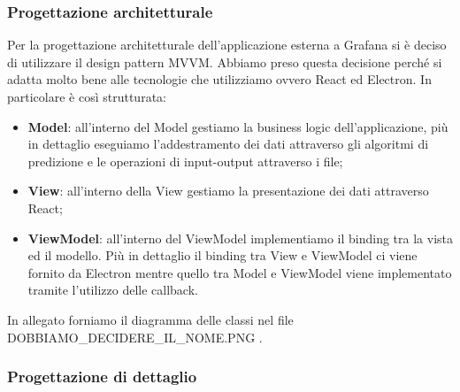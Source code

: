 		\subsubsection{Progettazione architetturale}
			Per la progettazione architetturale dell'applicazione esterna a Grafana si è deciso di utilizzare il design pattern MVVM. Abbiamo preso questa decisione perché si adatta molto bene alle tecnologie che utilizziamo ovvero React ed Electron. In particolare è così strutturata:
		\begin{itemize}
			\item \textbf{Model}: all'interno del Model gestiamo la business logic dell'applicazione, più in dettaglio eseguiamo l'addestramento dei dati attraverso gli algoritmi di predizione e le operazioni di input-output attraverso i file;
			\item \textbf{View}: all'interno della View gestiamo la presentazione dei dati attraverso React;
			\item \textbf{ViewModel}: all'interno del ViewModel implementiamo il binding tra la vista ed il modello. Più in dettaglio il binding tra View e ViewModel ci viene fornito da Electron mentre quello tra Model e ViewModel viene implementato tramite l'utilizzo delle callback.
		\end{itemize}
		In allegato forniamo il diagramma delle classi nel file DOBBIAMO_DECIDERE_IL_NOME.PNG .
		\subsubsection{Progettazione di dettaglio}
